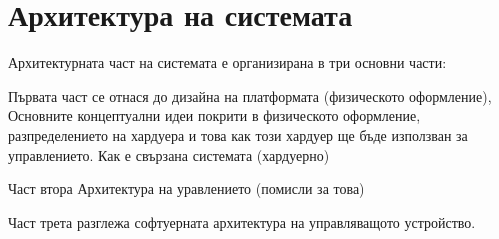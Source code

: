 \section{Архитектура на системата}

Архитектурната част на системата е организирана в три основни части:

Първата част се отнася до дизайна на платформата (физическото оформление),
Основните концептуални идеи покрити в физическото оформление, разпределението на хардуера
и това как този хардуер ще бъде използван за управлението.
Как е свързана системата (хардуерно)

Част втора Архитектура на уравлението (помисли за това)

Част трета разглежа софтуерната архитектура на управляващото устройство.

\cite{stmcurefman} 




